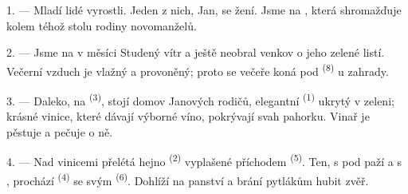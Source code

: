 %
%

\VUsaut{4.0mm}
\VUsaut{1.6mm}
\VUsaut{3.2mm}

\VUsaut{1.6mm}
\VUsaut{2.6mm}

\VUsaut{3.0mm}

1. --- Mladí lidé vyrostli. Jeden z nich, Jan, se žení. Jsme na , která shromažďuje kolem téhož stolu rodiny novomanželů.

2. --- Jsme na  v měsíci  Studený vítr  a
 ještě neobral venkov o jeho zelené listí. Večerní vzduch je vlažný
a provoněný; proto se večeře koná pod  \textsuperscript{(8)} u
zahrady.

3. --- Daleko, na  \textsuperscript{(3)}, stojí domov Janových rodičů,
elegantní  \textsuperscript{(1)} ukrytý v zeleni; krásné vinice, které
dávají výborné víno, pokrývají svah pahorku. Vinař je pěstuje a pečuje o ně.

4. --- Nad vinicemi přelétá hejno  \textsuperscript{(2)} vyplašené
příchodem  \textsuperscript{(5)}. Ten, s  pod paží a s
, prochází 
\textsuperscript{(4)} se svým  \textsuperscript{(6)}. Dohlíží na panství a
brání pytlákům hubit zvěř.

